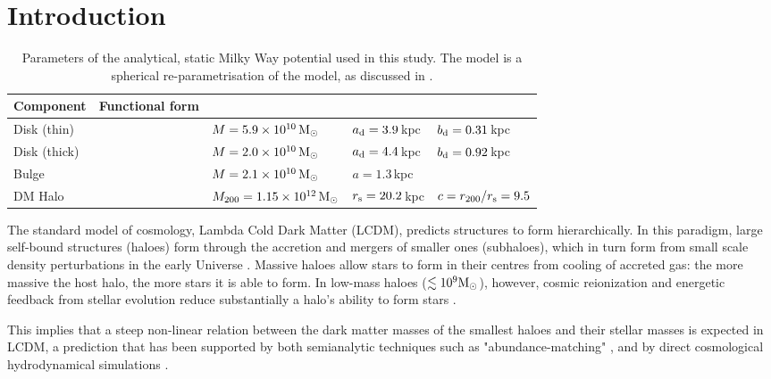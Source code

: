 \documentclass[fleqn,usenatbib]{mnras}
\begin{document}


\section{Introduction}
\label{SecIntro}

\begin{table*}
	\centering
	\caption{Parameters of the analytical, static Milky Way potential used in this study. The model is a spherical re-parametrisation of the \citet{McMillan2011} model, as discussed in \citet{Errani2020}.}
	\label{tab:MW}
	\begin{tabular}{lllll}
		\hline
		Component & Functional form & & & \\
		\hline
		Disk (thin) & \citet{Miyamoto1975} & $M=5.9\times10^{10}\,\rm M _\odot$ & $a_{\rm d} = 3.9$\,kpc & $b_{\rm d} = 0.31$\,kpc \\
		Disk (thick) & \citet{Miyamoto1975} & $M=2.0\times10^{10}\,\rm M _\odot$ & $a_{\rm d} = 4.4$\,kpc & $b_{\rm d} = 0.92$\,kpc \\
		Bulge & \citet{Hernquist1990} & $M=2.1\times10^{10}\,\rm M _\odot$ & $a=1.3$\,kpc & \\
		DM Halo & \citet{Navarro1997} & $M_{200}=1.15\times10^{12}\,\rm M _\odot$ & $r_{\rm s} = 20.2$\,kpc & $c=r_{200}/r_{\rm s}=9.5$\\
		\hline
	\end{tabular}
\end{table*}

The standard model of cosmology, Lambda Cold Dark Matter (LCDM), predicts structures to form hierarchically. In this paradigm, large self-bound structures (haloes) form through the accretion and mergers of smaller ones (subhaloes), which in turn form from small scale density perturbations in the early Universe \citep{White1978}. Massive haloes allow stars to form in their centres from cooling of accreted gas: the more massive the host halo, the more stars it is able to form. In low-mass haloes ($\lesssim 10^9 \rm M_\odot$), however, cosmic reionization and energetic feedback from stellar evolution reduce substantially a halo's ability to form stars \citep{Bullock2000,Benson2002,Somerville2002}.

This implies that a steep non-linear relation between the dark matter masses of the smallest haloes and their stellar masses is expected in LCDM, a prediction that has been supported by both semianalytic techniques such as "abundance-matching" \citep{Guo2010,Moster2013,Behroozi2013}, and by direct cosmological hydrodynamical simulations \citep[e.g., the Illustris and EAGLE simulations,][respectively]{Vogelsberger2014, Shaye2015}.
\end{document}
